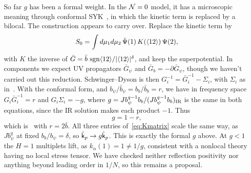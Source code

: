 So far $g$ has been a formal weight. In the $\mathcal{N}=0$ model, it has a microscopic meaning through conformal SYK~\cite{Gross:2017aos}, in which the kinetic term is replaced by a bilocal. The construction appears to carry over. Replace the kinetic term by
\begin{equation}\label{eq:bilocal}
S_0=\int d\mu_1d\mu_2\,\bar\Psi(1)\,K(\langle 12\rangle)\,\Psi(2),
\end{equation}
with $K$ the inverse of $\bar G=\bar b\,\operatorname{sgn}\langle 12\rangle/|\langle 12\rangle|^\delta$, and keep the superpotential. In components we expect UV propagators $\bar G_\psi$ and $\bar G_b=-\partial\bar G_\psi$, though we haven't carried out this reduction. Schwinger--Dyson is then $G_i^{-1}=\bar G_i^{-1}-\Sigma_i$, with $\Sigma_i$ as in~\cite{Peng:2017spg}. With the conformal form, and $b_\psi/\bar b_\psi=b_b/\bar b_b=r$, we have in frequency space $G_i\bar G_i^{-1}=r$ and $G_i\Sigma_i=-g$, where $g=Jb_\psi^{q-1}b_b/(Jb_\psi^{q-1}b_b)_{\rm IR}$ is the same in both equations, since the IR solution makes each product $-1$. Thus
\begin{equation}
g=1-r,
\end{equation}
which is~\cite[(C.9)]{Thong:2026} with $r=2\bar b$. All three entries of~\eqref{eq:Kmatrix} scale the same way, as $Jb_\psi^q$ at fixed $b_b/b_\psi=\delta$, so $\hat{\mathsf{k}}_p\to g\hat{\mathsf{k}}_p$. This is exactly the formal $g$ above. At $g<1$ the $H=1$ multiplets lift, as $k_\alpha(1)=1\neq1/g$, consistent with a nonlocal theory having no local stress tensor. We have checked neither reflection positivity nor anything beyond leading order in $1/N$, so this remains a proposal.
